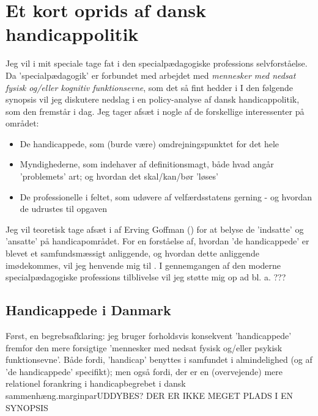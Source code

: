 \section{Et kort oprids af dansk handicappolitik}

Jeg vil i mit speciale tage fat i den specialpædagogiske professions selvforståelse.
Da 'specialpædagogik' er forbundet med arbejdet med \textit{mennesker med nedsat fysisk og/eller kognitiv funktionsevne}, som det så fint hedder i 
I den følgende synopsis vil jeg diskutere nedslag i en policy-analyse af dansk handicappolitik, som den fremstår i dag.
Jeg tager afsæt i nogle af de forskellige interessenter på området:
\begin{itemize}
  \item
    De handicappede, som (burde være) omdrejningspunktet for det hele
  \item
    Myndighederne, som indehaver af definitionsmagt, både hvad angår 'problemets' art; og hvordan det skal/kan/bør 'løses'
  \item
    De professionelle i feltet, som udøvere af velfærdsstatens gerning - og hvordan de udrustes til opgaven
\end{itemize}

Jeg vil teoretisk tage afsæt i  af Erving Goffman (\citeyear{goffmanAsylumsEssaysSocial1991}) for at belyse de 'indsatte' og 'ansatte' på handicapområdet.
For en forståelse af, hvordan 'de handicappede' er blevet et samfundsmæssigt anliggende, og hvordan dette anliggende imødekommes, vil jeg henvende mig til \citeauthor{scheurichPolicyArchaeologyNew1994}.
I gennemgangen af den moderne specialpædagogiske professions tilblivelse vil jeg støtte mig op ad bl. a. ??? 

\subsection{Handicappede i Danmark}
Først, en begrebsafklaring: jeg bruger forholdsvis konsekvent 'handicappede' fremfor den mere forsigtige 'mennesker med nedsat fysisk og/eller psykisk funktionsevne'.
Både fordi, 'handicap' benyttes i samfundet i almindelighed (og af 'de handicappede' specifikt); men også fordi, der er en (overvejende) mere relationel forankring i handicapbegrebet i dansk sammenhæng.marginpar{UDDYBES? DER ER IKKE MEGET PLADS I EN SYNOPSIS}  

